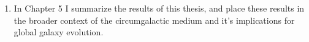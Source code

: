 \begin{enumerate}
\item{ In Chapter 5 I summarize the results of this thesis, and place these results in the broader context of the circumgalactic medium and it's implications for global galaxy evolution.}

\end{enumerate}






